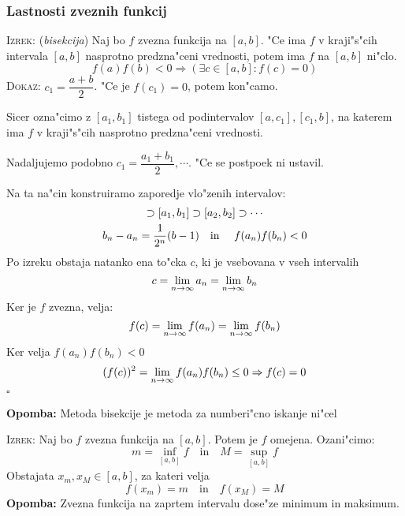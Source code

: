 \subsubsection{Lastnosti zveznih funkcij}
\textsc{Izrek:} (\emph{bisekcija}) Naj bo $f$ zvezna funkcija na $[a, b]$. "Ce ima $f$ v kraji"s"cih intervala $[a, b]$ nasprotno predzna"ceni vrednosti, potem ima $f$ na $[a, b]$ ni"clo.
\begin{equation*}
f(a)f(b) < 0 \Rightarrow (\exists c \in [a, b]: f(c) = 0)
\end{equation*}
\textsc{Dokaz:} $c_1 = \dfrac{a+b}{2}$. "Ce je $f(c_1) = 0$, potem kon"camo.

Sicer ozna"cimo z $[a_1, b_1]$ tistega od podintervalov $[a, c_1], [c_1, b]$, na katerem ima $f$ v kraji"s"cih nasprotno predzna"ceni vrednosti.

Nadaljujemo podobno $c_1 = \dfrac{a_1 + b_1}{2}, \cdots$. "Ce se postpoek ni ustavil.

Na ta na"cin konstruiramo zaporedje vlo"zenih intervalov:
\begin{gather*}
[a, b] \supset [a_1, b_1] \supset [a_2, b_2] \supset \cdots \\
b_n - a_n = \dfrac{1}{2^n}(b-1) \text{\quad in \quad} f(a_n)f(b_n) < 0
\end{gather*}
Po izreku obstaja natanko ena to"cka $c$, ki je vsebovana v vseh intervalih
\begin{equation*}
c = \lim_{n \rightarrow \infty} a_n = \lim_{n \rightarrow \infty} b_n
\end{equation*}
Ker je $f$ zvezna, velja:
\begin{equation*}
f(c) = \lim_{n \rightarrow \infty} f(a_n) = \lim_{n \rightarrow \infty} f(b_n)
\end{equation*}
Ker velja $f(a_n) f(b_n) < 0$
\begin{equation*}
(f(c))^2 = \lim_{n \rightarrow \infty} f(a_n) f(b_n) \leq 0 \Rightarrow f(c) = 0
\end{equation*}
\hfill $\square$

\textbf{Opomba:} Metoda bisekcije je metoda za numberi"cno iskanje ni"cel

\textsc{Izrek:} Naj bo $f$ zvezna funkcija na $[a, b]$. Potem je $f$ omejena. Ozani"cimo:
\begin{equation*}
m = \inf_{[a, b]} f \quad \text{in} \quad M = \sup_{[a, b]} f
\end{equation*}
Obstajata $x_m, x_M \in [a, b]$, za kateri velja
\begin{equation*}
f(x_m) = m \quad \text{in} \quad f(x_M) = M
\end{equation*}
\textbf{Opomba:} Zvezna funkcija na zaprtem intervalu dose"ze minimum in maksimum.

